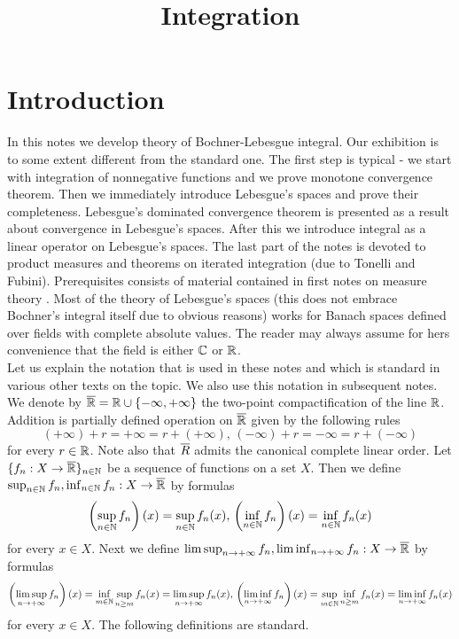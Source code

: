 



\title{Integration}
\date{}
\maketitle

\section{Introduction}
In this notes we develop theory of Bochner-Lebesgue integral. Our exhibition is to some extent different from the standard one. The first step is typical - we start with integration of nonnegative functions and we prove monotone convergence theorem. Then we immediately introduce Lebesgue's spaces and prove their completeness. Lebesgue's dominated convergence theorem is presented as a result about convergence in Lebesgue's spaces. After this we introduce integral as a linear operator on Lebesgue's spaces. The last part of the notes is devoted to product measures and theorems on iterated integration (due to Tonelli and Fubini). Prerequisites consists of material contained in first notes on measure theory \cite{Introduction_to_measure_theory}. Most of the theory of Lebesgue's spaces (this does not embrace Bochner's integral itself due to obvious reasons) works for Banach spaces defined over fields with complete absolute values. The reader may always assume for hers convenience that the field is either ${\mathbb C}$ or ${\mathbb R}$.\\
Let us explain the notation that is used in these notes and which is standard in various other texts on the topic. We also use this notation in subsequent notes. We denote by $\overline{{\mathbb R}}={\mathbb R}\cup \{-\infty,+\infty\}$ the two-point compactification of the line ${\mathbb R}$. Addition is partially defined operation on $\overline{{\mathbb R}}$ given by the following rules
$$(+\infty)+r=+\infty=r+(+\infty),\,(-\infty)+r=-\infty=r+(-\infty)$$
for every $r\in {\mathbb R}$. Note also that $\overline{R}$ admits the canonical complete linear order. Let $\{f_n:X\rightarrow \overline{{\mathbb R}}\}_{n\in {\mathbb N}}$ be a sequence of functions on a set $X$. Then we define $\sup_{n\in {\mathbb N}}f_n,\inf_{n\in {\mathbb N}}f_n:X\rightarrow \overline{{\mathbb R}}$ by formulas
$$\left(\sup_{n\in {\mathbb N}}f_n\right)(x) = \sup_{n\in {\mathbb N}}f_n(x),\,\left(\inf_{n\in {\mathbb N}}f_n\right)(x) = \inf_{n\in {\mathbb N}}f_n(x)$$
for every $x\in X$. Next we define $\limsup_{n\rightarrow +\infty}f_n,\liminf_{n\rightarrow +\infty}f_n:X\rightarrow \overline{{\mathbb R}}$ by formulas
$$\left(\limsup_{n\rightarrow +\infty}f_n\right)(x) =\inf_{m\in {\mathbb N}}\sup_{n\geq m}f_n(x) = \limsup_{n\rightarrow +\infty}f_n(x),\,\left(\liminf_{n\rightarrow +\infty}f_n\right)(x) = \sup_{m\in {\mathbb N}}\inf_{n\geq m}f_n(x) = \liminf_{n\rightarrow +\infty}f_n(x)$$
for every $x\in X$. The following definitions are standard.

